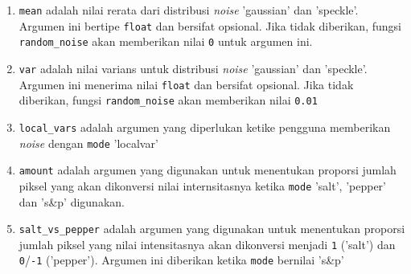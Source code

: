 \begin{enumerate}
   \item \texttt{mean} adalah nilai rerata dari distribusi \textit{noise} 'gaussian' dan 'speckle'. Argumen ini bertipe \texttt{float} dan bersifat opsional. Jika tidak diberikan, fungsi \texttt{random\_noise} akan memberikan nilai \texttt{0} untuk argumen ini.
   \item \texttt{var} adalah nilai varians untuk distribusi \textit{noise} 'gaussian' dan 'speckle'. Argumen ini menerima nilai \texttt{float} dan bersifat opsional. Jika tidak diberikan, fungsi \texttt{random\_noise} akan memberikan nilai \texttt{0.01}
   \item \texttt{local\_vars} adalah argumen yang diperlukan ketike pengguna memberikan \textit{noise} dengan \texttt{mode} 'localvar'
   \item \texttt{amount} adalah argumen yang digunakan untuk menentukan proporsi jumlah piksel yang akan dikonversi nilai internsitasnya ketika \texttt{mode} 'salt', 'pepper' dan 's\&p' digunakan.
   \item \texttt{salt\_vs\_pepper} adalah argumen yang digunakan untuk menentukan proporsi jumlah piksel yang nilai intensitasnya akan dikonversi menjadi \texttt{1} ('salt') dan \texttt{0}/\texttt{-1} ('pepper'). Argumen ini diberikan ketika \texttt{mode} bernilai 's\&p'
 \end{enumerate}
